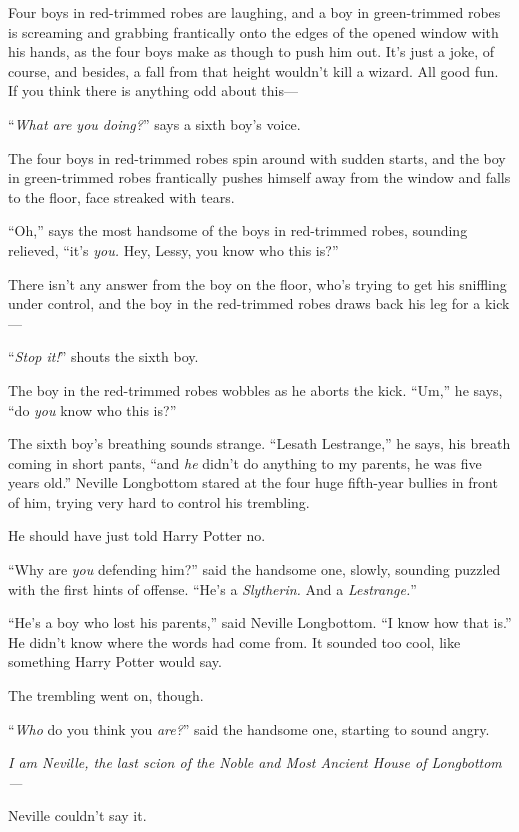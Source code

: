 Four boys in red-trimmed robes are laughing, and a boy in green-trimmed robes
is screaming and grabbing frantically onto the edges of the opened window with
his hands, as the four boys make as though to push him out. It’s just a joke,
of course, and besides, a fall from that height wouldn’t kill a wizard. All
good fun. If you think there is anything odd about this—

“\emph{What are you doing?}” says a sixth boy’s voice.

The four boys in red-trimmed robes spin around with sudden starts, and the boy
in green-trimmed robes frantically pushes himself away from the window and
falls to the floor, face streaked with tears.

“Oh,” says the most handsome of the boys in red-trimmed robes, sounding
relieved, “it’s \emph{you.} Hey, Lessy, you know who this is?”

There isn’t any answer from the boy on the floor, who’s trying to get his
sniffling under control, and the boy in the red-trimmed robes draws back his
leg for a kick—

“\emph{Stop it!}” shouts the sixth boy.

The boy in the red-trimmed robes wobbles as he aborts the kick. “Um,” he says,
“do \emph{you} know who this is?”

The sixth boy’s breathing sounds strange. “Lesath Lestrange,” he says, his
breath coming in short pants, “and \emph{he} didn’t do anything to my parents,
he was five years old.”
\later
Neville Longbottom stared at the four huge fifth-year bullies in front of him,
trying very hard to control his trembling.

He should have just told Harry Potter no.

“Why are \emph{you} defending him?” said the handsome one, slowly, sounding
puzzled with the first hints of offense. “He’s a \emph{Slytherin.} And a
\emph{Lestrange.}”

“He’s a boy who lost his parents,” said Neville Longbottom. “I know how that
is.” He didn’t know where the words had come from. It sounded too cool, like
something Harry Potter would say.

The trembling went on, though.

“\emph{Who} do you think you \emph{are?}” said the handsome one, starting to
sound angry.

\emph{I am Neville, the last scion of the Noble and Most Ancient House of
Longbottom—}

Neville couldn’t say it.

